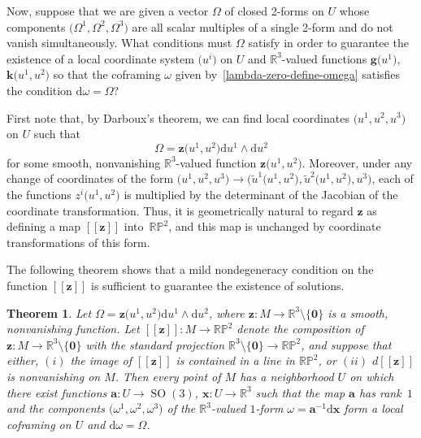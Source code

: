 \documentclass[pdftex]{sigma}
\numberwithin{equation}{section}
\newtheorem{Theorem}{Theorem}[section]
\renewcommand{\d}{\mathrm{d}}%
\newcommand{\bbR}{{\mathbb R}}
\newcommand{\bbP}{{\mathbb P}}
\newcommand{\SO}{\operatorname{SO}}
\newcommand{\mba}{\mathbf{a}}
\newcommand{\mbg}{\mathbf{g}}
\newcommand{\mbk}{\mathbf{k}}
\newcommand{\mbx}{\mathbf{x}}
\newcommand{\mbz}{\mathbf{z}}
\begin{document}
Now, suppose that we are given a vector $\Omega$ of closed 2-forms on $U$ whose components $\big(\Omega^1, \Omega^2, \Omega^3\big)$ are all scalar multiples of a single 2-form and do not vanish simultaneously. What conditions must $\Omega$ satisfy in order to guarantee the existence of a local coordinate system $\big(u^i\big)$ on $U$ and $\bbR^3$-valued functions $\mbg\big(u^1\big)$, $\mbk\big(u^1, u^2\big)$ so that the coframing $\omega$ given by~\eqref{lambda-zero-define-omega} satisfies the condition $\d \omega = \Omega$?

First note that, by Darboux's theorem, we can find local coordinates $\big(u^1, u^2, u^3\big)$ on $U$ such that
\[ \Omega = \mbz\big(u^1, u^2\big) \d u^1 \wedge \d u^2 \]
for some smooth, nonvanishing $\bbR^3$-valued function $\mbz\big(u^1, u^2\big)$. Moreover, under any change of coordinates of the form $\big(u^1, u^2, u^3\big) \to \big(\tilde{u}^1(u^1, u^2\big), \tilde{u}^2\big(u^1, u^2\big), u^3\big)$, each of the functions $z^i\big(u^1, u^2\big)$ is multiplied by the determinant of the Jacobian of the coordinate transformation. Thus, it is geometrically natural to regard $\mbz$ as defining a map $[\![\mbz]\!]$ into~$\bbR \bbP^2$, and this map is unchanged by coordinate transformations of this form.

The following theorem shows that a mild nondegeneracy condition on the function $[\![\mbz]\!]$ is sufficient to guarantee the existence of solutions.

\begin{Theorem}\label{big-theorem}Let $\Omega = \mbz\big(u^1, u^2\big) \d u^1 \wedge \d u^2$, where $\mbz\colon M \to \bbR^3\setminus \{\mathbf{0}\}$ is a smooth, nonvanishing function. Let $[\![\mbz]\!]\colon M \to \bbR \bbP^2$ denote the composition of $\mbz\colon M \to \bbR^3 \setminus\{\mathbf{0}\}$ with the standard projection $\bbR^3\setminus\{\mathbf{0}\} \to \bbR \bbP^2$, and suppose that either, $(i)$ the image of $[\![\mbz]\!]$ is contained in a line in $\bbR \bbP^2$, or $(ii)$ $d[\![\mbz]\!]$ is nonvanishing on $M$. Then every point of $M$ has a neighborhood $U$ on which there exist functions $\mba\colon U \to \SO(3)$, $\mbx\colon U \to \bbR^3$ such that the map $\mba$ has rank~$1$ and the components $\big(\omega^1, \omega^2, \omega^3\big)$ of the $\bbR^3$-valued $1$-form $\omega = \mba^{-1} \d\mbx$ form a local coframing on $U$ and $\d\omega = \Omega$.
\end{Theorem}
\end{document}
